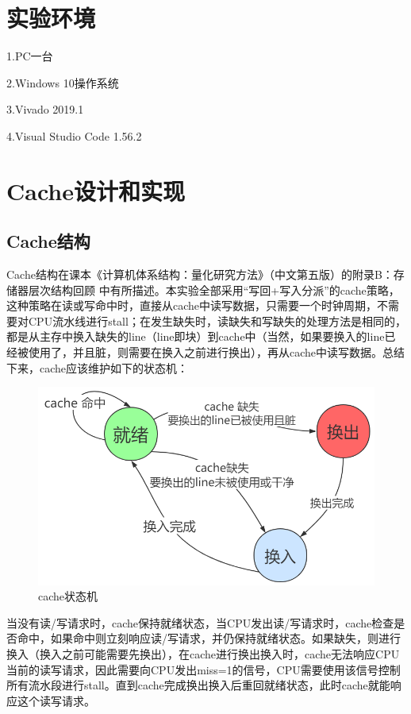 \documentclass{ctexart}
\begin{document}
\section{\hei 实验环境}
1.PC一台\par
2.Windows 10操作系统\par
3.Vivado 2019.1\par
4.Visual Studio Code 1.56.2
\section{\hei Cache设计和实现}
\subsection{\hei Cache结构}
Cache结构在课本《计算机体系结构：量化研究方法》（中文第五版）的附录B：存储器层次结构回顾 中有所描述。本实验全部采用“写回+写入分派”的cache策略，这种策略在读或写命中时，直接从cache中读写数据，只需要一个时钟周期，不需要对CPU流水线进行stall；在发生缺失时，读缺失和写缺失的处理方法是相同的，都是从主存中换入缺失的line（line即块）到cache中（当然，如果要换入的line已经被使用了，并且脏，则需要在换入之前进行换出），再从cache中读写数据。总结下来，cache应该维护如下的状态机：
\begin{figure}[H]
    \centering
    \includegraphics[scale=0.45]{ztj.png}
    \caption{cache状态机}
\end{figure}
\par 当没有读/写请求时，cache保持就绪状态，当CPU发出读/写请求时，cache检查是否命中，如果命中则立刻响应读/写请求，并仍保持就绪状态。如果缺失，则进行换入（换入之前可能需要先换出），在cache进行换出换入时，cache无法响应CPU当前的读写请求，因此需要向CPU发出miss=1的信号，CPU需要使用该信号控制所有流水段进行stall。直到cache完成换出换入后重回就绪状态，此时cache就能响应这个读写请求。
\end{document}
